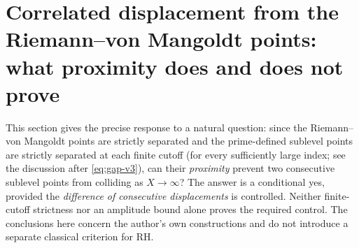 \documentclass[11pt,a4paper]{article}
\numberwithin{equation}{section}
\theoremstyle{definition}
\theoremstyle{remark}
\begin{document}
\section{Correlated displacement from the Riemann--von Mangoldt points:
       what proximity does and does not prove}\label{sec:correlated-v5}
This section gives the precise response to a natural question: since the
Riemann--von Mangoldt points are strictly separated and the prime-defined
sublevel points are strictly separated at each finite cutoff (for every sufficiently large index; see the discussion after \eqref{eq:gap-v3}), can their
\emph{proximity} prevent two consecutive sublevel points from colliding as
$X\to\infty$?  The answer is a conditional yes, provided the \emph{difference
of consecutive displacements} is controlled.  Neither finite-cutoff
strictness nor an amplitude bound alone proves the required control.
The conclusions here concern the author's own constructions and do not
introduce a separate classical criterion for RH.
\end{document}

